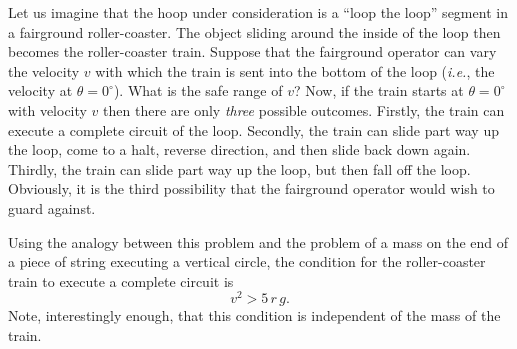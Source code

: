 Let us imagine that the hoop under consideration is a ``loop the loop'' segment in a
fairground roller-coaster. The object sliding around the inside of the loop then becomes
the roller-coaster train. Suppose that the fairground operator can vary the
velocity $v$ with which the train is sent into the bottom of the loop
 ({\em i.e.}, the velocity at $\theta=0^\circ$). What is the safe
range of $v$? Now, if the train starts at $\theta=0^\circ$ with velocity $v$ then
there are only {\em three} possible outcomes. Firstly, the train can execute a complete
circuit of the loop. Secondly, the train can slide part way up the loop, come to a halt,
reverse direction, and then slide back down again. Thirdly, the train can slide part way up the loop,
but then fall off the loop. Obviously, it is the third possibility that the fairground
operator would wish to guard against. 

Using the analogy between this problem and the problem of a mass on the end of a piece
of string executing a vertical circle, the condition for the roller-coaster train to
execute a complete circuit is
\begin{equation}\label{e755}
v^2 > 5\,r\,g.
\end{equation}
Note, interestingly enough, that this condition is independent of the mass of the train.

